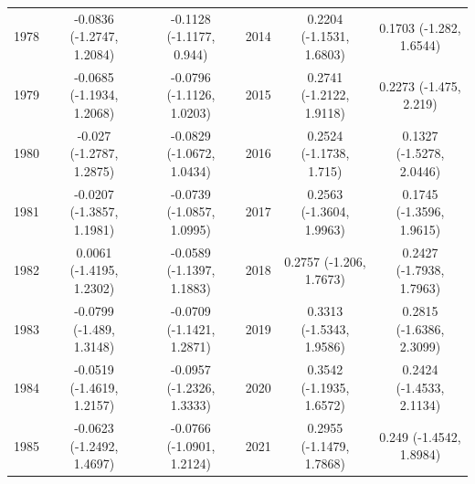 \documentclass[
  12pt,
]{report}
\begin{document}
\begin{table}[!h]
\begin{tabular}[t]{ccc|>{}ccc}
1978 & -0.0836 (-1.2747, 1.2084) & -0.1128 (-1.1177, 0.944) & 2014 & 0.2204 (-1.1531, 1.6803) & 0.1703 (-1.282, 1.6544)\\
1979 & -0.0685 (-1.1934, 1.2068) & -0.0796 (-1.1126, 1.0203) & 2015 & 0.2741 (-1.2122, 1.9118) & 0.2273 (-1.475, 2.219)\\
1980 & -0.027 (-1.2787, 1.2875) & -0.0829 (-1.0672, 1.0434) & 2016 & 0.2524 (-1.1738, 1.715) & 0.1327 (-1.5278, 2.0446)\\
1981 & -0.0207 (-1.3857, 1.1981) & -0.0739 (-1.0857, 1.0995) & 2017 & 0.2563 (-1.3604, 1.9963) & 0.1745 (-1.3596, 1.9615)\\
1982 & 0.0061 (-1.4195, 1.2302) & -0.0589 (-1.1397, 1.1883) & 2018 & 0.2757 (-1.206, 1.7673) & 0.2427 (-1.7938, 1.7963)\\
1983 & -0.0799 (-1.489, 1.3148) & -0.0709 (-1.1421, 1.2871) & 2019 & 0.3313 (-1.5343, 1.9586) & 0.2815 (-1.6386, 2.3099)\\
1984 & -0.0519 (-1.4619, 1.2157) & -0.0957 (-1.2326, 1.3333) & 2020 & 0.3542 (-1.1935, 1.6572) & 0.2424 (-1.4533, 2.1134)\\
1985 & -0.0623 (-1.2492, 1.4697) & -0.0766 (-1.0901, 1.2124) & 2021 & 0.2955 (-1.1479, 1.7868) & 0.249 (-1.4542, 1.8984)\\
\bottomrule
\end{tabular}
\end{table}
\end{document}
